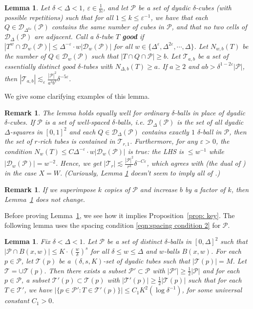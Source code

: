 \documentclass{amsart}
\newtheorem{lemma}[prop]{Lemma}
\newtheorem{remark}[prop]{Remark}
\newcommand{\N}{\mathbb{N}}
\newcommand{\T}{\mathcal{T}}
\newcommand{\eps}{\varepsilon}
\newcommand{\lesim}{\lesssim}
\newcommand{\cD}{\mathcal{D}}
\newcommand{\cP}{\mathcal{P}}
\begin{document}
\begin{lemma}\label{lem:r-rich}
     Let $\delta < \Delta < 1$, $\eps \in \frac{1}{\N}$, and let $\cP$ be a set of dyadic $\delta$-cubes (with possible repetitions) such that for all $1 \le k \le \eps^{-1}$, we have that each $Q \in \cD_{\Delta^{k\eps}} (\cP)$ contains the same number of cubes in $\cP$, and that no two cells of $\cD_\Delta (\cP)$ are adjacent. Call a $\delta$-tube $T$ \textbf{good} if $|T^w \cap \cD_w (\cP)| \le \Delta^{-\eps} \cdot w |\cD_w (\cP)|$ for all $w \in \{ \Delta^\eps, \Delta^{2\eps}, \cdots, \Delta \}$. Let $N_{w, b} (T)$ be the number of $Q \in \cD_w (\cP)$ such that $|T \cap Q \cap \cP| \ge b$. Let $\T_{a,b}$ be a set of essentially distinct good $\delta$-tubes with $N_{\Delta, b} (T) \ge a$. If $a \ge 2$ and $ab > \delta^{1-2\eps} |\cP|$, then $|\T_{a,b}| \lesim_{\eps} \frac{|\cP|^2}{a^3 b^2} \delta^{-5\eps}$.
\end{lemma}

We give some clarifying examples of this lemma.

\begin{remark}
    The lemma holds equally well for ordinary $\delta$-balls in place of dyadic $\delta$-cubes.
    If $\cP$ is a set of well-spaced $\delta$-balls, i.e. $\cD_\Delta (\cP)$ is the set of all dyadic $\Delta$-squares in $[0, 1]^2$ and each $Q \in \cD_\Delta (\cP)$ contains exactly $1$ $\delta$-ball in $\cP$, then the set of $r$-rich tubes is contained in $\T_{r,1}$. Furthermore, for any $\eps > 0$, the condition $N_w (T) \le C\Delta^{-\eps} \cdot w|\cD_w (\cP)|$ is true: the LHS is $\le w^{-1}$ while $|\cD_w (\cP)| = w^{-2}$. Hence, we get $|\T_r| \lesim \frac{|\cP|^2}{r^3} \delta^{-C \eps}$, which agrees with \cite[Theorem 3]{fu2022incidence} (the dual of \cite[Theorem 1.1]{guth2019incidence}) in the case $X = W$. (Curiously, Lemma \ref{lem:r-rich} doesn't seem to imply all of \cite[Theorem 3]{fu2022incidence}.)
\end{remark}

\begin{remark}
    If we superimpose $k$ copies of $\cP$ and increase $b$ by a factor of $k$, then Lemma~\ref{lem:r-rich} does not change.
\end{remark}

Before proving Lemma~\ref{lem:r-rich}, we see how it implies Proposition~\ref{prop: key}. The following lemma uses the spacing condition \eqref{eqn:spacing condition 2} for $\cP$.

\begin{lemma}\label{lem:elementary incidence}
    Fix $\delta < \Delta < 1$. Let $\cP$ be a set of distinct $\delta$-balls in $[0, \Delta]^2$ such that $|\cP \cap B(x, w)| \le K \cdot (\frac{w}{\delta})^s$ for all $\delta \le w \le \Delta$ and $w$-balls $B(x, w)$. For each $p \in \cP$, let $\T(p)$ be a $(\delta, s, K)$-set of dyadic tubes such that $|\T(p)| = M$. Let $\T = \cup \T(p)$. Then there exists a subset $\cP' \subset \cP$ with $|\cP'| \ge \frac{1}{2} |\cP|$ and for each $p \in \cP$, a subset $\T'(p) \subset \T(p)$ with $|\T'(p)| \ge \frac{1}{2} |\T(p)|$ such that for each $T \in \T'$, we have $|\{ p \in \cP' : T \in \T'(p) \}| \le C_1 K^2 (\log \delta^{-1})$, for some universal constant $C_1 > 0$.
\end{lemma}
\end{document}
